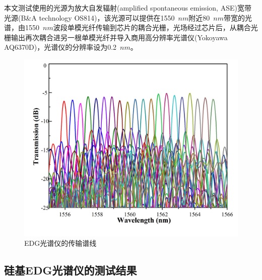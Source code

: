 本文测试使用的光源为放大自发辐射(amplified spontaneous emission, ASE)宽带光源(B\&A technology OS814)，该光源可以提供在1550~$nm$附近80~$nm$带宽的光谱，由1550~$nm$波段单模光纤传输到芯片的耦合光栅，光场经过芯片后，从耦合光栅输出再次耦合进另一根单模光纤并导入商用高分辨率光谱仪(Yokoyawa AQ6370D)，光谱仪的分辨率设为0.2~$nm$。

\begin{figure}[htb]
	\centering
	\includegraphics[width=12cm]{./Pictures/edg_transmission.jpg}
	\captionsetup{justification=centering}
	\caption{EDG光谱仪的传输谱线}
	\label{edg_transmission}
\end{figure}

\subsection{硅基EDG光谱仪的测试结果}

